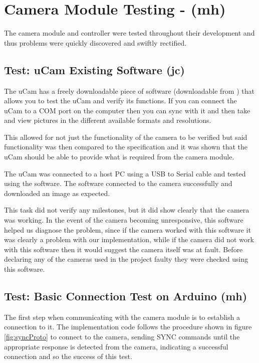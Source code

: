 \section{Camera Module Testing - (mh)}

The camera module and controller were tested throughout their development and thus problems were quickly discovered and swiftly rectified.

\subsection{Test: uCam Existing Software (jc)}
\label{sec:existing_software_test}

The uCam has a freely downloadable piece of software (downloadable from \cite{ucam_test_software}) that allows you to test the uCam and verify its functions. If you can connect the uCam to a COM port on the computer then you can sync with it and then take and view pictures in the different available formats and resolutions.

This allowed for not just the functionality of the camera to be verified but said functionality was then compared to the specification and it was shown that the uCam should be able to provide what is required from the camera module.

The uCam was connected to a host PC using a USB to Serial cable and tested using the software. The software connected to the camera successfully and downloaded an image as expected.

This task did not verify any milestones, but it did show clearly that the camera was working. In the event of the camera becoming unresponsive, this software helped us diagnose the problem, since if the camera worked with this software it was clearly a problem with our implementation, while if the camera did not work with this software then it would suggest the camera itself was at fault. Before declaring any of the cameras used in the project faulty they were checked using this software.

\subsection{Test: Basic Connection Test on Arduino (mh)}
\label{sec:basic_connection_test}

The first step when communicating with the camera module is to establish a connection to it.  The implementation code follows the procedure shown in figure \ref{fig:syncProto} to connect to the camera, sending SYNC commands until the appropriate response is detected from the camera, indicating a successful connection and so the success of this test.

